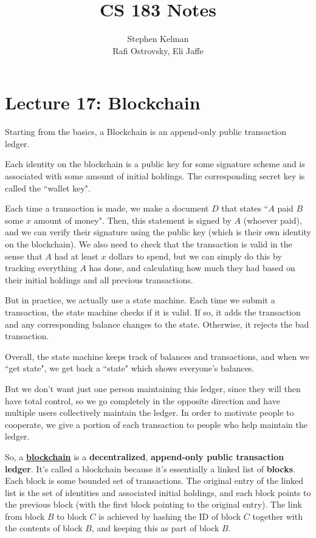 \documentclass[11pt]{article}
\title{CS 183 Notes}
\author{Stephen Kelman\\ Rafi Ostrovsky, Eli Jaffe}
\newcommand{\tb}{\textbf}
\newcommand{\ul}{\underline}
\begin{document}
\section{Lecture 17: Blockchain}
Starting from the basics, a Blockchain is an append-only public transaction ledger.

Each identity on the blockchain is a public key for some signature scheme and is associated with some amount of initial holdings. The corresponding secret key is called the ``wallet key".\smallskip

Each time a transaction is made, we make a document \(D\) that states ``\(A\) paid \(B\) some \(x\) amount of money". Then, this statement is signed by \(A\) (whoever paid), and we can verify their signature using the public key (which is their own identity on the blockchain). We also need to check that the transaction is valid in the sense that \(A\) had at least \(x\) dollars to spend, but we can simply do this by tracking everything \(A\) has done, and calculating how much they had based on their initial holdings and all previous transactions.\medskip

But in practice, we actually use a state machine. Each time we submit a transaction, the state machine checks if it is valid. If so, it adds the transaction and any corresponding balance changes to the state. Otherwise, it rejects the bad transaction.

Overall, the state machine keeps track of balances and transactions, and when we ``get state", we get back a ``state" which shows everyone's balances.\smallskip

But we don't want just one person maintaining this ledger, since they will then have total control, so we go completely in the opposite direction and have multiple users collectively maintain the ledger. In order to motivate people to cooperate, we give a portion of each transaction to people who help maintain the ledger.\smallskip

So, a \tb{\ul{blockchain}} is a \tb{decentralized}, \tb{append-only public transaction ledger}. It's called a blockchain because it's essentially a linked list of \tb{blocks}. Each block is some bounded set of transactions. The original entry of the linked list is the set of identities and associated initial holdings, and each block points to the previous block (with the first block pointing to the original entry). The link from block \(B\) to block \(C\) is achieved by hashing the ID of block \(C\) together with the contents of block \(B\), and keeping this as part of block \(B\).
\end{document}
